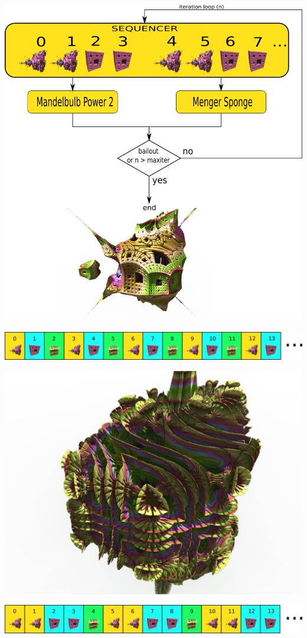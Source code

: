 \includegraphics[width=\linewidth]{img/manual/media/iteration_loop_hybrid.png}

\includegraphics[width=\linewidth]{img/manual/media/iteration_loop_hybrid_sequence_1.png}

\includegraphics[width=0.7\linewidth]{img/manual/media/hybrid_sequence_example_1.png}

\includegraphics[width=\linewidth]{img/manual/media/iteration_loop_hybrid_sequence_2.png}

